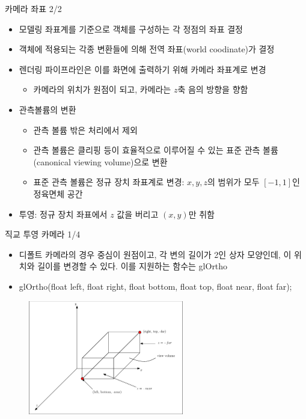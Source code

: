 \documentclass{beamer}
\begin{document}
\begin{frame}{카메라 좌표 2/2}

\begin{itemize}
\item 모델링 좌표계를 기준으로 객체를 구성하는 각 정점의 좌표 결정
\item 객체에 적용되는 각종 변환들에 의해 전역 좌표(world coodinate)가 결정
\item 렌더링 파이프라인은 이를 화면에 출력하기 위해 카메라 좌표계로 변경
	\begin{itemize}
	\item 카메라의 위치가 원점이 되고, 카메라는 $z$축 음의 방향을 향함
	\end{itemize}
\item 관측볼륨의 변환
	\begin{itemize}
	\item 관측 볼륨 밖은 처리에서 제외
	\item 관측 볼륨은 클리핑 등이 효율적으로 이루어질 수 있는 표준 관측 볼륨(canonical viewing volume)으로 변환
	\item 표준 관측 볼륨은 정규 장치 좌표계로 변경: $x, y, z$의 범위가 모두 $[-1,1]$인 정육면체 공간
	\end{itemize}
\item 투영: 정규 장치 좌표에서 $z$ 값을 버리고 $(x,y)$만 취함
\end{itemize}

\end{frame}



\begin{frame}{직교 투영 카메라 1/4}

{\small
\begin{itemize}
\item 디폴트 카메라의 경우 중심이 원점이고, 각 변의 길이가 2인 상자 모양인데, 이 위치와 길이를 변경할 수 있다. 이를 지원하는 함수는 {\sf glOrtho}
\item glOrtho(float left, float right, float bottom, float top, float near, float far);
\end{itemize}
}

\begin{figure}
    \includegraphics[height=5cm]{OGL_camera/cameraViewVolume.eps}
\end{figure}

\end{frame}
\end{document}
